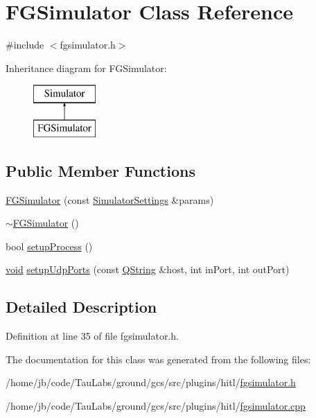 \hypertarget{class_f_g_simulator}{\section{\-F\-G\-Simulator \-Class \-Reference}
\label{class_f_g_simulator}
}


{\ttfamily \#include $<$fgsimulator.\-h$>$}

\-Inheritance diagram for \-F\-G\-Simulator\-:\begin{figure}[H]
\begin{center}
\leavevmode
\includegraphics[height=2.000000cm]{class_f_g_simulator}
\end{center}
\end{figure}
\subsection*{\-Public \-Member \-Functions}
\begin{DoxyCompactItemize}
\item 
\hyperlink{group___h_i_t_l_plugin_gac56390412d899fc09748d050d06a7fab}{\-F\-G\-Simulator} (const \hyperlink{group___h_i_t_l_plugin_ga052199f1328d3002bce3e45345aa7f4e}{\-Simulator\-Settings} \&params)
\item 
\hyperlink{group___h_i_t_l_plugin_ga379c8b16215b0b40514c3b522fabf816}{$\sim$\-F\-G\-Simulator} ()
\item 
bool \hyperlink{group___h_i_t_l_plugin_ga704da6f44b2b3538b2e1c3239cb2a76c}{setup\-Process} ()
\item 
\hyperlink{group___u_a_v_objects_plugin_ga444cf2ff3f0ecbe028adce838d373f5c}{void} \hyperlink{group___h_i_t_l_plugin_ga806877c20e5dc15efd67bb1c5e4f0710}{setup\-Udp\-Ports} (const \hyperlink{group___u_a_v_objects_plugin_gab9d252f49c333c94a72f97ce3105a32d}{\-Q\-String} \&host, int in\-Port, int out\-Port)
\end{DoxyCompactItemize}


\subsection{\-Detailed \-Description}


\-Definition at line 35 of file fgsimulator.\-h.



\-The documentation for this class was generated from the following files\-:\begin{DoxyCompactItemize}
\item 
/home/jb/code/\-Tau\-Labs/ground/gcs/src/plugins/hitl/\hyperlink{fgsimulator_8h}{fgsimulator.\-h}\item 
/home/jb/code/\-Tau\-Labs/ground/gcs/src/plugins/hitl/\hyperlink{fgsimulator_8cpp}{fgsimulator.\-cpp}\end{DoxyCompactItemize}
